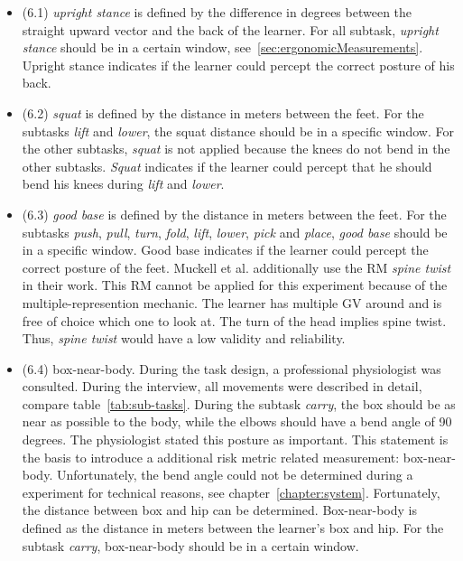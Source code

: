 \begin{itemize}
	\item[] (6.1) \textit{upright stance} is defined by the difference in degrees between the straight upward vector and the back of the learner. For all subtask, \textit{upright stance} should be in a certain window, see~\ref{sec:ergonomicMeasurements}. Upright stance indicates if the learner could percept the correct posture of his back.
	
	\item[] (6.2) \textit{squat} is defined by the distance in meters between the feet. For the subtasks \textit{lift} and \textit{lower}, the squat distance should be in a specific window. For the other subtasks, \textit{squat} is not applied because the knees do not bend in the other subtasks. \textit{Squat} indicates if the learner could percept that he should bend his knees during \textit{lift} and \textit{lower}.
	
	\item[] (6.3) \textit{good base} is defined by the distance in meters between the feet. For the subtasks \textit{push}, \textit{pull}, \textit{turn}, \textit{fold}, \textit{lift}, \textit{lower}, \textit{pick} and \textit{place}, \textit{good base} should be in a specific window. Good base indicates if the learner could percept the correct posture of the feet.
	Muckell et al.\cite{muckell} additionally use the RM \textit{spine twist} in their work. This RM cannot be applied for this experiment because of the multiple-represention mechanic. The learner has multiple GV around and is free of choice which one to look at. The turn of the head implies spine twist. Thus, \textit{spine twist} would have a low validity and reliability.
	
	\item[] (6.4) box-near-body. During the task design, a professional physiologist was consulted. During the interview, all movements were described in detail, compare table~\ref{tab:sub-tasks}. During the subtask \textit{carry}, the box should be as near as possible to the body, while the elbows should have a bend angle of 90 degrees. The physiologist stated this posture as important. This statement is the basis to introduce a additional risk metric related measurement: box-near-body. Unfortunately, the bend angle could not be determined during a experiment for technical reasons, see chapter~\ref{chapter:system}. Fortunately, the distance between box and hip can be determined. Box-near-body is defined as the distance in meters between the learner's box and hip. For the subtask \textit{carry}, box-near-body should be in a certain window.
\end{itemize}


